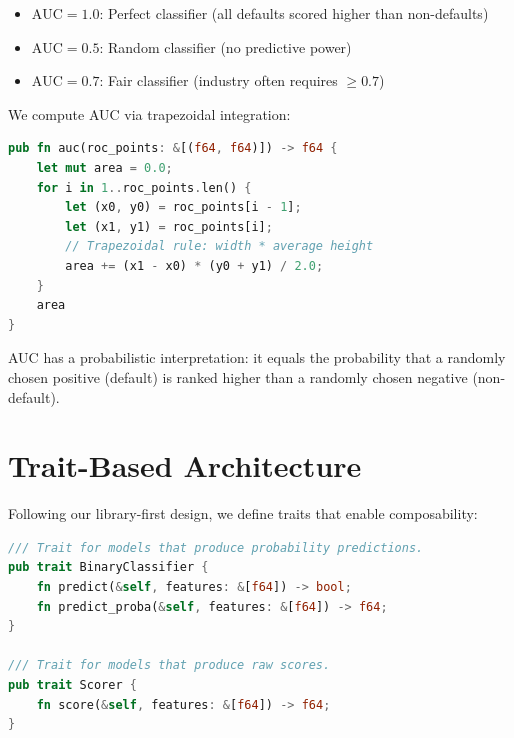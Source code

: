 \begin{itemize}
    \item $\text{AUC} = 1.0$: Perfect classifier (all defaults scored higher than non-defaults)
    \item $\text{AUC} = 0.5$: Random classifier (no predictive power)
    \item $\text{AUC} = 0.7$: Fair classifier (industry often requires $\geq 0.7$)
\end{itemize}

We compute AUC via trapezoidal integration:

\begin{marginfigure}[-1cm]
    \centering
    
    \caption{ROC curve: the blue line shows classifier performance, dashed line is random guessing. Area under curve (AUC) is shaded.}
    \label{fig:roc-curve}
\end{marginfigure}

\begin{lstlisting}[language=Rust]
pub fn auc(roc_points: &[(f64, f64)]) -> f64 {
    let mut area = 0.0;
    for i in 1..roc_points.len() {
        let (x0, y0) = roc_points[i - 1];
        let (x1, y1) = roc_points[i];
        // Trapezoidal rule: width * average height
        area += (x1 - x0) * (y0 + y1) / 2.0;
    }
    area
}
\end{lstlisting}

\begin{keyinsight}
AUC has a probabilistic interpretation: it equals the probability that a
randomly chosen positive (default) is ranked higher than a randomly chosen
negative (non-default).
\end{keyinsight}

\section{Trait-Based Architecture}

Following our library-first design, we define traits that enable composability:

\begin{lstlisting}[language=Rust]
/// Trait for models that produce probability predictions.
pub trait BinaryClassifier {
    fn predict(&self, features: &[f64]) -> bool;
    fn predict_proba(&self, features: &[f64]) -> f64;
}

/// Trait for models that produce raw scores.
pub trait Scorer {
    fn score(&self, features: &[f64]) -> f64;
}
\end{lstlisting}

